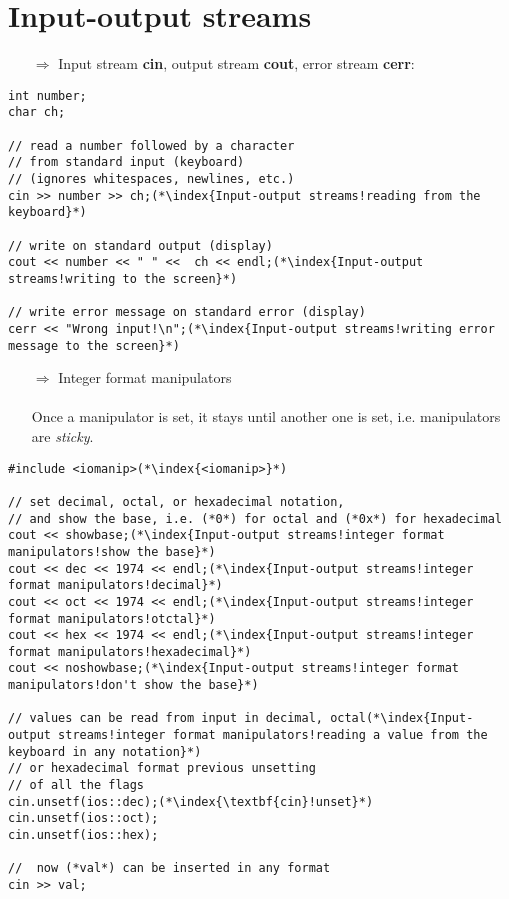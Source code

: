 \documentclass[10pt]{article}
\begin{document}
\section{Input-output streams}
\small
\begin{enumerate}
\item[$\Rightarrow$] Input stream \textbf{cin}, output stream \textbf{cout}, error stream \textbf{cerr}:
\end{enumerate}
\begin{lstlisting}
int number;
char ch;

// read a number followed by a character
// from standard input (keyboard)
// (ignores whitespaces, newlines, etc.)
cin >> number >> ch;(*\index{Input-output streams!reading from the keyboard}*)

// write on standard output (display)
cout << number << " " <<  ch << endl;(*\index{Input-output streams!writing to the screen}*)

// write error message on standard error (display)
cerr << "Wrong input!\n";(*\index{Input-output streams!writing error message to the screen}*)
\end{lstlisting}
\begin{enumerate}
\item[$\Rightarrow$] Integer format manipulators\\ \\ Once a  manipulator is set, it stays until another one is set, i.e. manipulators are \emph{sticky}.
\end{enumerate}
\begin{lstlisting}
#include <iomanip>(*\index{<iomanip>}*)

// set decimal, octal, or hexadecimal notation,
// and show the base, i.e. (*0*) for octal and (*0x*) for hexadecimal
cout << showbase;(*\index{Input-output streams!integer format manipulators!show the base}*)
cout << dec << 1974 << endl;(*\index{Input-output streams!integer format manipulators!decimal}*)
cout << oct << 1974 << endl;(*\index{Input-output streams!integer format manipulators!otctal}*)
cout << hex << 1974 << endl;(*\index{Input-output streams!integer format manipulators!hexadecimal}*)
cout << noshowbase;(*\index{Input-output streams!integer format manipulators!don't show the base}*)

// values can be read from input in decimal, octal(*\index{Input-output streams!integer format manipulators!reading a value from the keyboard in any notation}*)
// or hexadecimal format previous unsetting
// of all the flags
cin.unsetf(ios::dec);(*\index{\textbf{cin}!unset}*)
cin.unsetf(ios::oct);
cin.unsetf(ios::hex);

//  now (*val*) can be inserted in any format
cin >> val;
\end{lstlisting}
\end{document}
